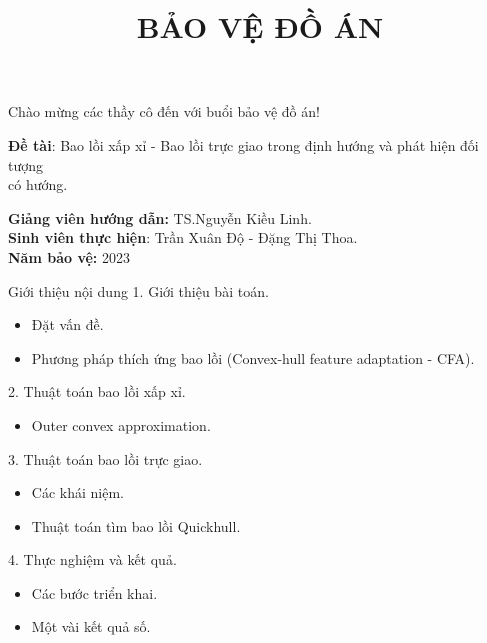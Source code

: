 \documentclass[11pt]{beamer}
\title[ \footnotesize  \textcolor{red}{\bf Đồ án tốt nghiệp} -- \textcolor{blue}{Trần Xuân Độ - Đặng Thị Thoa}]{\Large  \bf BẢO VỆ ĐỒ ÁN}
\institute{\bf  Hà Nội, năm 2023\\}
\theoremstyle{definition}
\theoremstyle{plain}
\theoremstyle{plain}
\theoremstyle{remark}
\newcommand{\myitem}{\item[\tikz{\draw[ball color=myPurple,shade] (0,0) circle (0.17em);}]}
\newcommand\Fontvi{\fontsize{10}{7.2}\selectfont}
\begin{document}
\begin{frame}{\begin{center}
			Chào mừng các thầy cô đến với buổi bảo vệ đồ án!
	\end{center}}
	\begin{center}
	{\large	\textbf{Đề tài}: Bao lồi xấp xỉ - Bao lồi trực giao trong định hướng và phát hiện đối tượng \\
		có hướng.\\}
	\end{center}
	
	\textbf{Giảng viên hướng dẫn:} TS.Nguyễn Kiều Linh.\\
	
	\textbf{Sinh viên thực hiện}: Trần Xuân Độ - Đặng Thị Thoa.\\
	
	\textbf{Năm bảo vệ:} 2023
	
	
\end{frame}

\begin{frame}{Giới thiệu nội dung}
	1. Giới thiệu bài toán.
	\begin{itemize}
		\myitem Đặt vấn đề.
		\myitem Phương pháp thích ứng bao lồi (Convex-hull feature adaptation - CFA).
	 \end{itemize}
	2. Thuật toán bao lồi xấp xỉ.
	\begin{itemize}
		\myitem Outer convex approximation.
	\end{itemize}
	3. Thuật toán bao lồi trực giao. 
	\begin{itemize}
		\myitem Các khái niệm. 
		\myitem Thuật toán tìm bao lồi Quickhull.
	\end{itemize}
	4. Thực nghiệm và kết quả.
	\begin{itemize}
		\myitem Các bước triển khai.
		\myitem Một vài kết quả số.
	\end{itemize}
	
\end{frame}

	
	
\end{document}
